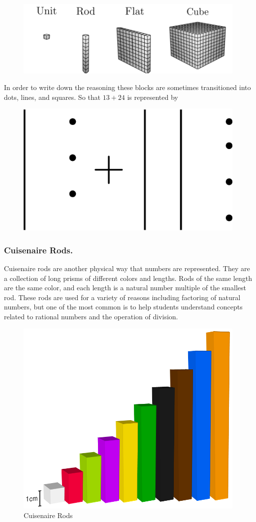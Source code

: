 \documentclass[
]{book}
\theoremstyle{definition}
\theoremstyle{definition}
\theoremstyle{definition}
\theoremstyle{definition}
\theoremstyle{remark}
\begin{document}
\begin{figure}

{\centering \includegraphics[width=0.8\linewidth]{tikz/base10blocks} 

}

\end{figure}

In order to write down the reasoning these blocks are sometimes transitioned into dots, lines, and squares. So that \(13+24\) is represented by

\begin{figure}

{\centering \includegraphics[width=0.6\linewidth]{tikz/base10block-addition} 

}

\end{figure}

\hypertarget{cuisenaire-rods.}{%
\subsubsection*{Cuisenaire Rods.}\label{cuisenaire-rods.}}

Cuisenaire rods are another physical way that numbers are represented. They are a collection of long prisms of different colors and lengths. Rods of the same length are the same color, and each length is a natural number multiple of the smallest rod. These rods are used for a variety of reasons including factoring of natural numbers, but one of the most common is to help students understand concepts related to rational numbers and the operation of division.

\begin{figure}

{\centering \includegraphics[width=0.3\linewidth]{images/Cuisenaire-Rods-2} 

}

\caption{Cuisenaire Rods}\label{fig:unnamed-chunk-17}
\end{figure}
\end{document}
